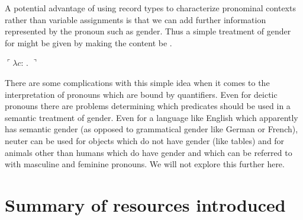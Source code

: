 A potential advantage of using record types to characterize pronominal contexts
rather than variable assignments is that we can add further
information represented by the pronoun such as gender.   Thus a simple
treatment of gender for \preveg{} might be given by making the content
be \nexteg{}.
\begin{ex}
  $\ulcorner\lambda c$:
                                 . 
$\urcorner$ 
\end{ex} 
There are some complications with this simple
idea when it comes to the interpretation of pronouns which are bound
by quantifiers.  Even for deictic pronouns there are problems
determining which predicates should be used in a semantic treatment of
gender.  Even for a language like English which apparently has
semantic gender (as opposed to grammatical gender like German or
French), neuter can be used for objects which do not have gender (like
tables) and for animals other than humans which do have gender and
which can be referred to with masculine and feminine pronouns.  We
will not explore this further here.


\section{Summary of resources introduced}


